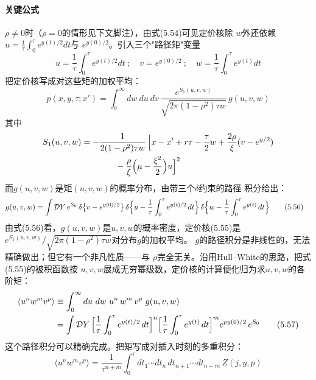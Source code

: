\paragraph{关键公式}
$\rho\neq0$时（$\rho=0$的情形见下文脚注），由式(5.54)可见定价核除
$w$外还依赖$u=\frac{1}{\tau}\int_{0}^{\tau}e^{y(t)/2}dt$与
$e^{y(0)/2}$。引入三个"路径矩"变量
\begin{equation*}
u=\frac{1}{\tau}\int_{0}^{\tau}e^{y(t)/2}dt\ ;\quad
v=e^{y(0)/2}\ ;\quad
w=\frac{1}{\tau}\int_{0}^{\tau}e^{y(t)}dt
\end{equation*}
把定价核写成对这些矩的加权平均：
\begin{equation*}
p(x,y,\tau;x')=\int_{0}^{\infty}dw\ du\ dv\,
\frac{e^{S_{1}(u,v,w)}}{\sqrt{2\pi(1-\rho^{2})\tau w}}\,g(u,v,w)
\tag{5.55}
\end{equation*}
其中
\begin{align*}
S_{1}(u,v,w)&=-\frac{1}{2(1-\rho^{2})\tau w}\,
\Bigl[x-x'+r\tau-\frac{\tau}{2}w
+\frac{2\rho}{\xi}(v-e^{y/2})\\
&\qquad\qquad-\frac{\rho}{\xi}\Bigl(\mu-\frac{\xi^{2}}{2}\Bigr)u\Bigr]^{2}
\end{align*}
而$g(u,v,w)$是矩$(u,v,w)$的概率分布，由带三个$\delta$约束的路径
积分给出：
\begin{align*}
g(u,v,w)&=\int\mathcal{D}Y\,e^{S_{0}}\,
\delta\bigl\{v-e^{y(0)/2}\bigr\}\,
\delta\Bigl\{u-\frac{1}{\tau}\int_{0}^{\tau}e^{y(t)/2}\,dt\Bigr\}\,
\delta\Bigl\{w-\frac{1}{\tau}\int_{0}^{\tau}e^{y(t)}\,dt\Bigr\}
\tag{5.56}
\end{align*}
由式(5.56)看，$g(u,v,w)$是$u,v,w$的概率密度，定价核(5.55)是
$e^{S_{1}(u,v,w)}/\sqrt{2\pi(1-\rho^{2})\tau w}$对分布$g$的加权平均。
$g$的路径积分是非线性的，无法精确做出；但它有一个非凡性质——与
$\rho$完全无关。沿用Hull--White的思路，把式(5.55)的被积函数按
$u,v,w$展成无穷幂级数，定价核的计算便化归为求$u,v,w$的各阶矩：
\begin{align*}
\langle u^{n}w^{m}v^{p}\rangle
&\equiv\int_{0}^{\infty}du\ dw\ u^{n}\,w^{m}\,v^{p}\ g(u,v,w)\\
&=\int\mathcal{D}Y\,
\Bigl[\frac{1}{\tau}\int_{0}^{\tau}e^{y(t)/2}\,dt\Bigr]^{n}
\Bigl[\frac{1}{\tau}\int_{0}^{\tau}e^{y(t)}\,dt\Bigr]^{m}
e^{py(0)/2}\,e^{S_{0}}
\tag{5.57}
\end{align*}
这个路径积分可以精确完成。把矩写成对插入时刻的多重积分：
\begin{equation*}
\langle u^{n}w^{m}v^{p}\rangle
=\frac{1}{\tau^{n+m}}\int_{0}^{\tau}dt_{1}\cdots dt_{n}\,
dt_{n+1}\cdots dt_{n+m}\,Z(j,y,p)
\tag{5.58}
\end{equation*}
